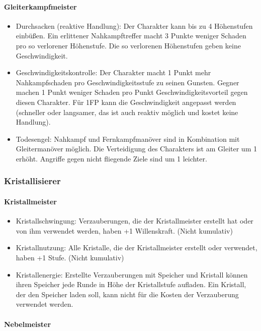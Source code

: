 \documentclass{article}
\begin{document}
\paragraph{Gleiterkampfmeister}

\begin{itemize}
\item Durchsacken (reaktive Handlung): Der Charakter kann bis zu 4 Höhenstufen einbüßen. Ein erlittener Nahkampftreffer macht 3 Punkte weniger Schaden pro so verlorener Höhenstufe. Die so verlorenen Höhenstufen geben keine Geschwindigkeit.
\item Geschwindigkeitskontrolle: Der Charakter macht 1 Punkt mehr Nahkampfschaden pro Geschwindigkeitsstufe zu seinen Gunsten. Gegner machen 1 Punkt weniger Schaden pro Punkt Geschwindigkeitsvorteil gegen diesen Charakter. Für 1FP kann die Geschwindigkeit angepasst werden (schneller oder langsamer, das ist auch reaktiv möglich und kostet keine Handlung).
\item Todesengel: Nahkampf und Fernkampfmanöver sind in Kombination mit Gleitermanöver möglich. Die Verteidigung des Charakters ist am Gleiter um 1 erhöht. Angriffe gegen nicht fliegende Ziele sind um 1 leichter.
\end{itemize}

\subsubsection{Kristallisierer}

\paragraph{Kristallmeister}

\begin{itemize}
\item Kristallschwingung: Verzauberungen, die der Kristallmeister erstellt hat oder von ihm verwendet werden, haben +1 Willenskraft. (Nicht kumulativ)
\item Kristallnutzung: Alle Kristalle, die der Kristallmeister erstellt oder verwendet, haben +1 Stufe. (Nicht kumulativ)
\item Kristallenergie: Erstellte Verzauberungen mit Speicher und Kristall können ihren Speicher jede Runde in Höhe der Kristallstufe aufladen. Ein Kristall, der den Speicher laden soll, kann nicht für die Kosten der Verzauberung verwendet werden.
\end{itemize}

\paragraph{Nebelmeister}
\end{document}
